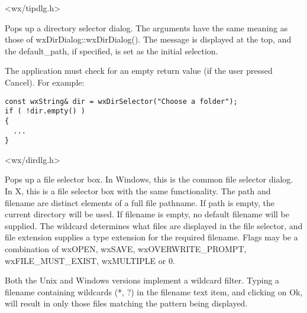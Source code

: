 <wx/tipdlg.h>


\label{wxdirselector}


Pops up a directory selector dialog. The arguments have the same meaning as
those of wxDirDialog::wxDirDialog(). The message is displayed at the top,
and the default\_path, if specified, is set as the initial selection.

The application must check for an empty return value (if the user pressed
Cancel). For example:

\begin{verbatim}
const wxString& dir = wxDirSelector("Choose a folder");
if ( !dir.empty() )
{
  ...
}
\end{verbatim}


<wx/dirdlg.h>


\label{wxfileselector}


Pops up a file selector box. In Windows, this is the common file selector
dialog. In X, this is a file selector box with the same functionality.
The path and filename are distinct elements of a full file pathname.
If path is empty, the current directory will be used. If filename is empty,
no default filename will be supplied. The wildcard determines what files
are displayed in the file selector, and file extension supplies a type
extension for the required filename. Flags may be a combination of wxOPEN,
wxSAVE, wxOVERWRITE\_PROMPT, wxFILE\_MUST\_EXIST, wxMULTIPLE or 0.

Both the Unix and Windows versions implement a wildcard filter. Typing a
filename containing wildcards (*, ?) in the filename text item, and
clicking on Ok, will result in only those files matching the pattern being
displayed.

